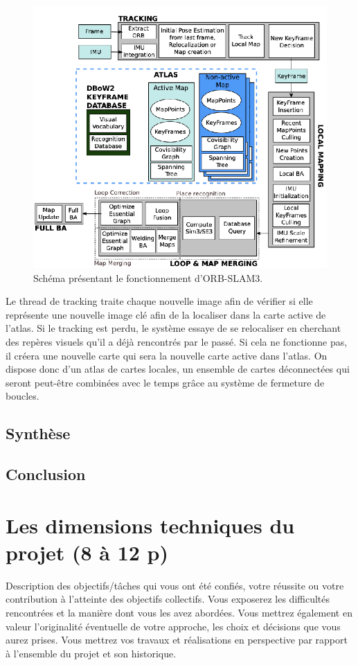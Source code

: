 \documentclass[11pt]{article}
\begin{document}
  \begin{figure}[hbt]  
    \includegraphics[width=\textwidth]{ORB_SLAM3.png}    
    \caption{Schéma présentant le fonctionnement d'ORB-SLAM3.}
    \label{fig:ORBSLAM3}
  \end{figure} 

  Le thread de tracking traite chaque nouvelle image afin de vérifier si elle représente une nouvelle image clé afin de la localiser
  dans la carte active de l'atlas. Si le tracking est perdu, le système essaye de se relocaliser en cherchant des repères visuels 
  qu'il a déjà rencontrés par le passé. Si cela ne fonctionne pas, il créera une nouvelle carte qui sera la nouvelle carte active dans l'atlas.
  On dispose donc d'un atlas de cartes locales, un ensemble de cartes déconnectées qui seront peut-être combinées avec le temps grâce au 
  système de fermeture de boucles.

  \pagebreak

  \subsection{Synthèse}

  \pagebreak

  \subsection{Conclusion}

  \pagebreak
  \section{Les dimensions techniques du projet (8 à 12 p)}
  Description des objectifs/tâches qui vous ont été confiés, votre réussite ou votre contribution à
  l’atteinte des objectifs collectifs. Vous exposerez les difficultés rencontrées et la manière dont vous
  les avez abordées. Vous mettrez également en valeur l’originalité éventuelle de votre approche, les
  choix et décisions que vous aurez prises. Vous mettrez vos travaux et réalisations en perspective par
  rapport à l’ensemble du projet et son historique.
\end{document}
